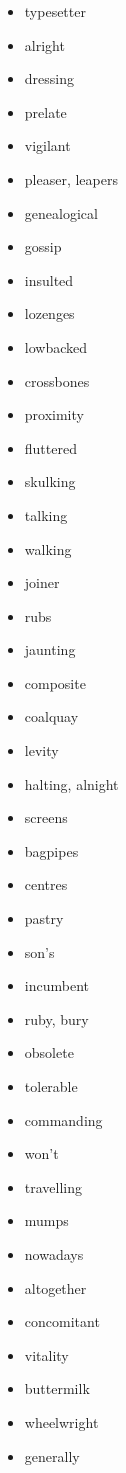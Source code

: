 \documentclass{article}
\begin{document}
\begin{itemize}
    \item typesetter
    \item alright
    \item dressing
    \item prelate
    \item vigilant
    \item pleaser, leapers
    \item genealogical
    \item gossip
    \item insulted
    \item lozenges
    \item lowbacked
    \item crossbones
    \item proximity
    \item fluttered
    \item skulking
    \item talking
    \item walking
    \item joiner
    \item rubs
    \item jaunting
    \item composite
    \item coalquay
    \item levity
    \item halting, alnight
    \item screens
    \item bagpipes
    \item centres
    \item pastry
    \item son's
    \item incumbent
    \item ruby, bury
    \item obsolete
    \item tolerable
    \item commanding
    \item won't
    \item travelling
    \item mumps
    \item nowadays
    \item altogether
    \item concomitant
    \item vitality
    \item buttermilk
    \item wheelwright
    \item generally

\end{itemize}
\end{document}
